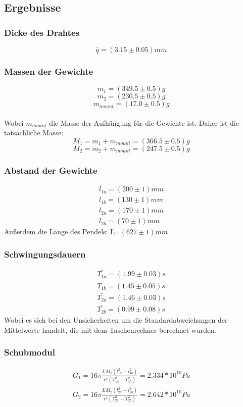 \documentclass{article}
\begin{document}
\subsection{Ergebnisse}
\subsubsection*{Dicke des Drahtes}
$$\bar{q}=(3.15 \pm 0.05)mm$$ 
\subsubsection*{Massen der Gewichte}
$$m_1=(349.5 \pm 0.5)g$$
$$m_2=(230.5 \pm 0.5)g$$
$$m_{mount}=(17.0 \pm 0.5)g$$\\
Wobei $m_{mount}$ die Masse der Aufhängung für die Gewichte ist. Daher ist die tatsächliche Masse:
$$M_1=m_1+m_{mount}=(366.5 \pm 0.5)g$$
$$M_2=m_2+m_{mount}=(247.5 \pm 0.5)g$$
\subsubsection*{Abstand der Gewichte}
\begin{gather*}
l_{1a}=(200 \pm 1)mm\\
l_{1b}=(130 \pm 1)mm\\
l_{2a}=(170 \pm 1)mm\\
l_{2b}=(70 \pm 1)mm
\end{gather*}
Außerdem die Länge des Pendels: L=$(627 \pm 1)mm$
\subsubsection*{Schwingungsdauern}
\begin{gather*}
\bar{T_{1a}}=(1.99 \pm 0.03)s\\
\bar{T_{1b}}=(1.45 \pm 0.05)s\\
\bar{T_{2a}}=(1.46 \pm 0.03)s\\
\bar{T_{2b}}=(0.99 \pm 0.08)s
\end{gather*}
Wobei es sich bei den Unsicherheiten um die Standardabweichungen der Mittelwerte handelt, die mit dem Taschenrechner berechnet wurden.
\subsubsection*{Schubmodul}
\begin{gather*}
G_1=16\pi\frac{LM_1(l_{1a}^2-l_{1b}^2)}{r^4(T_{1a}^2-T_{1b}^2)}=2.334*10^{10} Pa\\
G_2=16\pi\frac{LM_2(l_{2a}^2-l_{2b}^2)}{r^4(T_{2a}^2-T_{2b}^2)}=2.642*10^{10} Pa
\end{gather*} 
\end{document}
